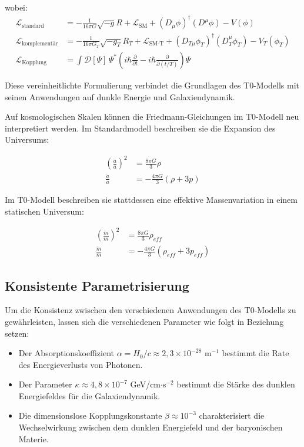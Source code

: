 \documentclass[a4paper,12pt]{article}
\begin{document}
	wobei:
	\begin{align}
		\mathcal{L}_\text{standard} &= -\frac{1}{16\pi G} \sqrt{-g} R + \mathcal{L}_\text{SM} + (D_\mu \phi)^\dagger (D^\mu \phi) - V(\phi) \\
		\mathcal{L}_\text{komplementär} &= -\frac{1}{16\pi G_T} \sqrt{-g_T} R_T + \mathcal{L}_\text{SM-T} + (D_{T\mu} \phi_T)^\dagger (D_T^\mu \phi_T) - V_T(\phi_T) \\
		\mathcal{L}_\text{Kopplung} &= \int \mathcal{D}[\Psi] \, \Psi^* \left( i\hbar \frac{\partial}{\partial t} - i\hbar \frac{\partial}{\partial (t/T)} \right) \Psi
	\end{align}
	
	Diese vereinheitlichte Formulierung verbindet die Grundlagen des T0-Modells mit seinen Anwendungen auf dunkle Energie und Galaxiendynamik.
	
	Auf kosmologischen Skalen können die Friedmann-Gleichungen im T0-Modell neu interpretiert werden. Im Standardmodell beschreiben sie die Expansion des Universums:
	
	\begin{align}
		\left(\frac{\dot{a}}{a}\right)^2 &= \frac{8\pi G}{3}\rho \\
		\frac{\ddot{a}}{a} &= -\frac{4\pi G}{3}(\rho + 3p)
	\end{align}
	
	Im T0-Modell beschreiben sie stattdessen eine effektive Massenvariation in einem statischen Universum:
	
	\begin{align}
		\left(\frac{\dot{m}}{m}\right)^2 &= \frac{8\pi G}{3}\rho_{eff} \\
		\frac{\ddot{m}}{m} &= -\frac{4\pi G}{3}(\rho_{eff} + 3p_{eff})
	\end{align}
	
	\subsection{Konsistente Parametrisierung}
	
	Um die Konsistenz zwischen den verschiedenen Anwendungen des T0-Modells zu gewährleisten, lassen sich die verschiedenen Parameter wie folgt in Beziehung setzen:
	
	\begin{itemize}
		\item Der Absorptionskoeffizient $\alpha = H_{0}/c \approx 2,3 \times 10^{-28}$ m$^{-1}$ bestimmt die Rate des Energieverlusts von Photonen.
		\item Der Parameter $\kappa \approx 4,8 \times 10^{-7}$ GeV/cm$\cdot$s$^{-2}$ bestimmt die Stärke des dunklen Energiefeldes für die Galaxiendynamik.
		\item Die dimensionslose Kopplungskonstante $\beta \approx 10^{-3}$ charakterisiert die Wechselwirkung zwischen dem dunklen Energiefeld und der baryonischen Materie.
	\end{itemize}
	
\end{document}
